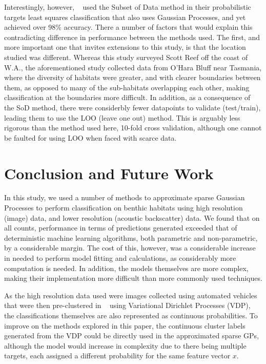 \documentclass[journal]{IEEEtran}
\begin{document}
Interestingly, however, ~\citet{bender12} used the Subset of Data method in their probabilistic targets least squares classification that also uses Gaussian Processes, and yet achieved over 98\% accuracy. There a number of factors that would explain this contradicting difference in performance between the methods used. The first, and more important one that invites extensions to this study, is that the location studied was different. Whereas this study surveyed Scott Reef off the coast of W.A., the aforementioned study collected data from O'Hara Bluff near Tasmania, where the diversity of habitats were greater, and with clearer boundaries between them, as opposed to many of the sub-habitats overlapping each other, making classification at the boundaries more difficult. In addition, as a consequence of the SoD method, there were considerbly fewer datapoints to validate (test/train), leading them to use the LOO (leave one out) method. This is arguably less rigorous than the method used here, 10-fold cross validation, although one cannot be faulted for using LOO when faced with scarce data.

\section{Conclusion and Future Work}

In this study, we used a number of methods to approximate sparse Gaussian Processes to perform classification on benthic habitats using high resolution (image) data, and lower resolution (acoustic backscatter) data. We found that on all counts, performance in terms of predictions generated exceeded that of deterministic machine learning algorithms, both parametric and non-parametric, by a considerable margin. The cost of this, however, was a considerable increase in needed to perform model fitting and calculations, as considerably more computation is needed. In addition, the models themselves are more complex, making their implementation more difficult than more commonly used techniques.

As the high resolution data used were images collected using automated vehicles that were then pre-clustered in ~\citet{steinberg11} using Variational Dirichlet Processes (VDP), the classifications themselves are also represented as continuous probabilities. To improve on the methods explored in this paper, the continuous cluster labels generated from the VDP could be directly used in the approximated sparse GPs, although the model would increase in complexity due to there being multiple targets, each assigned a different probability for the same feature vector $x$. 
\end{document}

